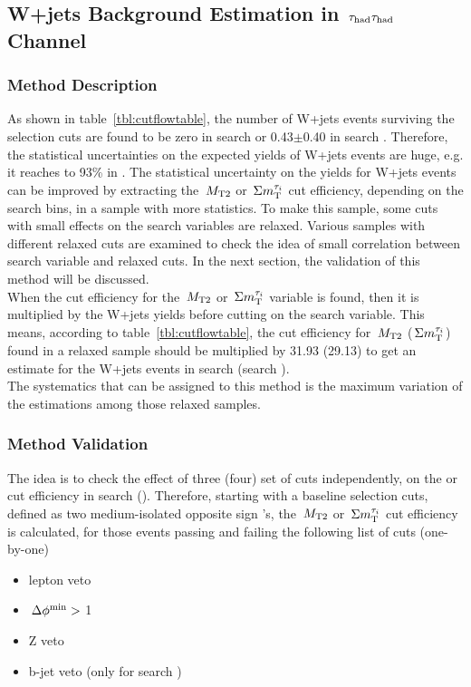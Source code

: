 \subsection{\texorpdfstring{W+jets Background Estimation in $\,\tau_{\rm had}\tau_{\rm had}$ Channel}{W+jets Background Estimation in tau-tau Channel}}
\subsubsection{Method Description}
As shown in table~\ref{tbl:cutflowtable}, the number of W+jets events surviving 
the selection cuts are found to be zero in search \binone or 0.43$\pm$0.40 in search \bintwo. 
Therefore, the statistical uncertainties on the expected yields of W+jets events
are huge, e.g. it reaches to 93\% in \bintwo. 
 The statistical uncertainty on the yields for W+jets events can be improved by extracting 
the $\,{M_{\rm T2}}$ or $\,\Sigma m_{\rm T}^{\tau_i}$ cut efficiency, depending on the search bins, in a sample with more 
statistics. To make this sample, some cuts with small effects on the search variables are 
relaxed. Various samples with different relaxed cuts are examined to check the idea of small correlation 
between search variable and relaxed cuts. In the next section, the validation of this method will be discussed.\\
When the cut efficiency for the $\,{M_{\rm T2}}$ or $\,\Sigma m_{\rm T}^{\tau_i}$ variable is found, then it is multiplied by the W+jets 
yields before cutting on the search variable. This means, according to table~\ref{tbl:cutflowtable}, the cut efficiency for 
$\,{M_{\rm T2}}$ ($\,\Sigma m_{\rm T}^{\tau_i}$) found in a relaxed sample should be multiplied by 31.93 (29.13) to get an 
estimate for the W+jets events in search \binone (search \bintwo).\\
The systematics that can be assigned to this method is the maximum
variation of the estimations among those relaxed samples.
\subsubsection{Method Validation}
The idea is to check the effect of three (four) set of cuts independently, 
on the \mttwo or \SumMT cut efficiency in search \binone (\bintwo). 
Therefore, starting with a baseline selection cuts, defined as two 
medium-isolated opposite sign \Tau's, the $\,{M_{\rm T2}}$ or $\,\Sigma m_{\rm T}^{\tau_i}$ cut 
efficiency is calculated, for those events passing and failing the following list of cuts (one-by-one)
\begin{itemize}
\item lepton veto
\item $\,{\Delta\phi^{\rm min}}>$ 1
\item Z veto 
\item b-jet veto (only for search \bintwo)
\end{itemize}

